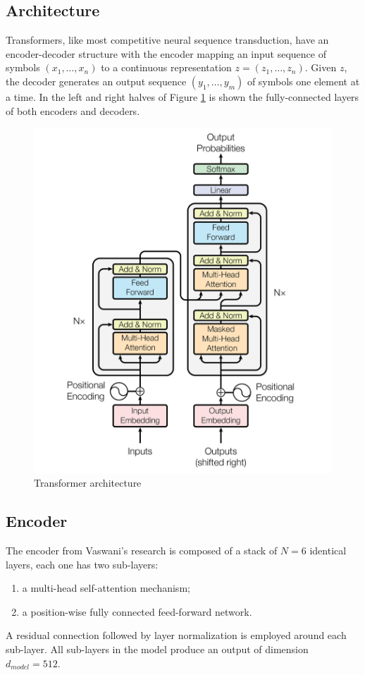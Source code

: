 \documentclass[\main/main.tex]{subfiles}
\begin{document}
\newpage
\subsection{Architecture}
Transformers, like most competitive neural sequence transduction, have an encoder-decoder structure with the encoder mapping an input sequence of symbols $(x_1, \dots, x_n)$ to a continuous representation $z = (z_1, \dots, z_n)$. Given $z$, the decoder generates an output sequence $(y_1, \dots, y_m)$ of symbols one element at a time. In the left and right halves of Figure \ref{fig:transformer_architecture} is shown the fully-connected layers of both encoders and decoders.
\begin{figure}[H]
    \centering
    \includegraphics[scale=0.4]{images/transformer/transformer_model_architecture.png}
    \caption{Transformer architecture}
    \label{fig:transformer_architecture}
\end{figure}

\subsection{Encoder}
The encoder from Vaswani's research \cite{vaswani2017attention} is composed of a stack of $N=6$ identical layers, each one has two sub-layers:
\begin{enumerate}
    \item a multi-head self-attention mechanism;
    \item a position-wise fully connected feed-forward network.
\end{enumerate}
A residual connection followed by layer normalization is employed around each sub-layer. All sub-layers in the model produce an output of dimension $d_{model} = 512$.
\end{document}
